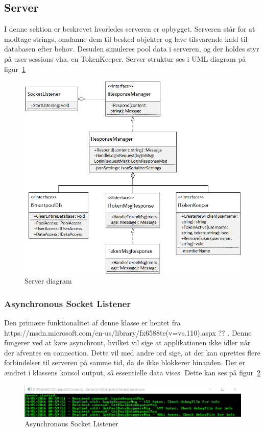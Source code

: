 \subsection{Server}
I denne sektion er beskrevet hvorledes serveren er opbygget. Serveren står for at modtage strings, omdanne dem til besked objekter og lave tilsvarende kald til databasen efter behov. Desuden simuleres pool data i serveren, og der holdes styr på user sessions vha. en TokenKeeper. Server struktur ses i UML diagram på figur~\ref{fig:ConnectionServer}

\begin{figure}
	\centering
	\includegraphics[width=0.9\linewidth]{figs/connection/ConnectionServer.png}
	\caption{Server diagram}
	\label{fig:ConnectionServer}
\end{figure}

\subsubsection{Asynchronous Socket Listener}
Den primære funktionalitet af denne klasse er hentet fra https://msdn.microsoft.com/en-us/library/fx6588te(v=vs.110).aspx ?? . Denne fungerer ved at køre asynchront, hvilket vil sige at applikationen ikke idler når der afventes en connection. Dette vil med andre ord sige, at der kan oprettes flere forbindelser til serveren på samme tid, da de ikke blokkerer hinanden.
Der er ændret i klassens konsol output, så essentielle data vises. Dette kan ses på figur~\ref{fig:asynchronousSocketListener}

\begin{figure}
	\centering
	\includegraphics[width=0.7\linewidth]{figs/connection/asynchronousSocketListener.png}
	\caption{Asynchronous Socket Listener}
	\label{fig:asynchronousSocketListener}
\end{figure}

